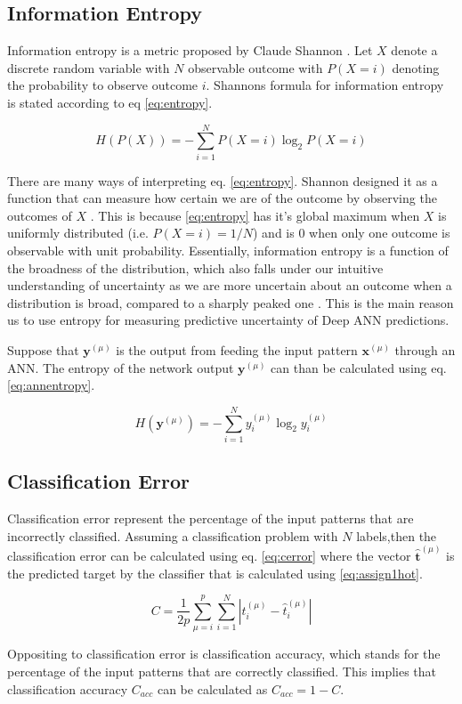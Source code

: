 \subsection{Information Entropy}

Information entropy is a metric proposed by Claude Shannon \cite{jaynes1957information,shannon1948mathematical}. Let $X$ denote a discrete random variable with $N$ observable outcome with $P(X=i)$ denoting the probability to observe outcome $i$. Shannons formula for information entropy is stated according to eq \eqref{eq:entropy}.

\begin{equation}
    \label{eq:entropy}
    H(P(X)) = -\sum_{i=1}^N P(X=i)\log_2P(X=i)
\end{equation}

There are many ways of interpreting eq. \eqref{eq:entropy}. Shannon designed it as a function that can measure how certain we are of the outcome by observing the outcomes of $X$ \cite{shannon1948mathematical}. This is because \eqref{eq:entropy} has it's global maximum when $X$ is uniformly distributed (i.e. $P(X=i) = 1/N$) and is 0 when only one outcome is observable with unit probability. Essentially, information entropy is a function of the broadness of the distribution, which also falls under our intuitive understanding of uncertainty as we are more uncertain about an outcome when a distribution is broad, compared to a sharply peaked one \cite{jaynes1957information}. This is the main reason us to use entropy for measuring predictive uncertainty of Deep ANN predictions.

Suppose that $\bm{y}^{(\mu)}$ is the output from feeding the input pattern $\bm{x}^{(\mu)}$ through an ANN. The entropy of the network output $\bm{y}^{(\mu)}$ can than be calculated using eq. \eqref{eq:annentropy}.

\begin{equation}
    \label{eq:annentropy}
    H(\bm{y}^{(\mu)}) = -\sum_{i=1}^N y_i^{(\mu)}\log_2y_i^{(\mu)}
\end{equation}

\subsection{Classification Error}

Classification error represent the percentage of the input patterns that are incorrectly classified. Assuming a classification problem with $N$ labels,then the classification error can be calculated using eq. \eqref{eq:cerror} where the vector $\bm{\hat{t}}^{(\mu)}$ is the predicted target by the classifier that is calculated using \eqref{eq:assign1hot}\cite{mehligcourseslides}.

\begin{equation}
    \label{eq:cerror}
    C=\frac{1}{2p}\sum_{\mu=i}^{p}\sum_{i=1}^N|t_i^{(\mu)}-\hat{t}^{(\mu)}_i|
\end{equation}

Oppositing to classification error is classification accuracy, which stands for the percentage of the input patterns that are correctly classified. This implies that classification accuracy $C_{acc}$ can be calculated as $C_{acc} = 1 - C$\cite{mehligcourseslides}.
